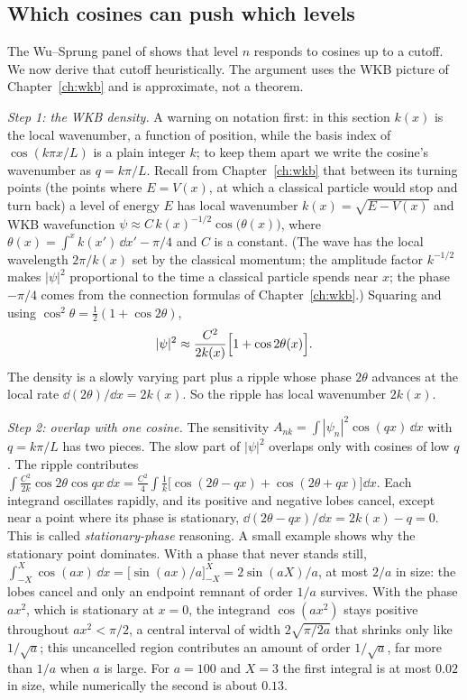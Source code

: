 \subsection{Which cosines can push which levels}

The Wu--Sprung panel of  shows that level $n$ responds to cosines up to a cutoff. We now derive that cutoff heuristically. The argument uses the WKB picture of Chapter~\ref{ch:wkb} and is approximate, not a theorem.

\emph{Step 1: the WKB density.} A warning on notation first: in this section $k(x)$ is the local wavenumber, a function of position, while the basis index of $\cos(k\pi x/L)$ is a plain integer $k$; to keep them apart we write the cosine's wavenumber as $q=k\pi/L$. Recall from Chapter~\ref{ch:wkb} that between its turning points (the points where $E=V(x)$, at which a classical particle would stop and turn back) a level of energy $E$ has local wavenumber $k(x)=\sqrt{E-V(x)}$ and WKB wavefunction $\psi\approx C\,k(x)^{-1/2}\cos\bigl(\theta(x)\bigr)$, where $\theta(x)=\int^xk(x')\,\dd x'-\pi/4$ and $C$ is a constant. (The wave has the local wavelength $2\pi/k(x)$ set by the classical momentum; the amplitude factor $k^{-1/2}$ makes $|\psi|^2$ proportional to the time a classical particle spends near $x$; the phase $-\pi/4$ comes from the connection formulas of Chapter~\ref{ch:wkb}.) Squaring and using $\cos^2\theta=\tfrac12(1+\cos2\theta)$,
\[
|\psi|^2\approx\frac{C^2}{2k(x)}\Bigl[1+\cos2\theta(x)\Bigr].
\]
The density is a slowly varying part plus a ripple whose phase $2\theta$ advances at the local rate $\dd(2\theta)/\dd x=2k(x)$. So the ripple has local wavenumber $2k(x)$.

\emph{Step 2: overlap with one cosine.} The sensitivity $A_{nk}=\int|\psi_n|^2\cos(qx)\,\dd x$ with $q=k\pi/L$ has two pieces. The slow part of $|\psi|^2$ overlaps only with cosines of low $q$. The ripple contributes $\int\frac{C^2}{2k}\cos2\theta\cos qx\,\dd x=\frac{C^2}{4}\int\frac1k\bigl[\cos(2\theta-qx)+\cos(2\theta+qx)\bigr]\dd x$. Each integrand oscillates rapidly, and its positive and negative lobes cancel, except near a point where its phase is stationary, $\dd(2\theta-qx)/\dd x=2k(x)-q=0$. This is called \emph{stationary-phase} reasoning. A small example shows why the stationary point dominates. With a phase that never stands still, $\int_{-X}^{X}\cos(ax)\,\dd x=\bigl[\sin(ax)/a\bigr]_{-X}^{X}=2\sin(aX)/a$, at most $2/a$ in size: the lobes cancel and only an endpoint remnant of order $1/a$ survives. With the phase $ax^2$, which is stationary at $x=0$, the integrand $\cos(ax^2)$ stays positive throughout $ax^2<\pi/2$, a central interval of width $2\sqrt{\pi/2a}$ that shrinks only like $1/\sqrt a$; this uncancelled region contributes an amount of order $1/\sqrt a$, far more than $1/a$ when $a$ is large. For $a=100$ and $X=3$ the first integral is at most $0.02$ in size, while numerically the second is about $0.13$.

